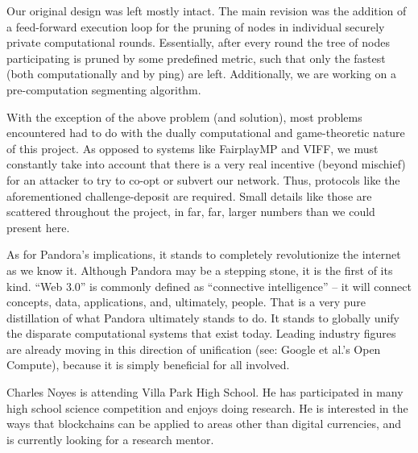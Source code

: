 \documentclass[journal,11pt]{IEEEtran}
\begin{document}
\par Our original design was left mostly intact. The main revision was the addition of a feed-forward execution loop for the pruning of nodes in individual securely private computational rounds. Essentially, after every round the tree of nodes participating is pruned by some predefined metric, such that only the fastest (both computationally and by ping) are left. Additionally, we are working on a pre-computation segmenting algorithm.

\par With the exception of the above problem (and solution), most problems encountered had to do with the dually computational and game-theoretic nature of this project. As opposed to systems like FairplayMP and VIFF, we must constantly take into account that there is a very real incentive (beyond mischief) for an attacker to try to co-opt or subvert our network. Thus, protocols like the aforementioned challenge-deposit are required. Small details like those are scattered throughout the project, in far, far, larger numbers than we could present here.

\par As for Pandora’s implications, it stands to completely revolutionize the internet as we know it. Although Pandora may be a stepping stone, it is the first of its kind. “Web 3.0” is commonly defined as “connective intelligence” – it will connect concepts, data, applications, and, ultimately, people. That is a very pure distillation of what Pandora ultimately stands to do. It stands to globally unify the disparate computational systems that exist today. Leading industry figures are already moving in this direction of unification (see: Google et al.’s Open Compute), because it is simply beneficial for all involved.


\begin{IEEEbiographynophoto}{Charles Noyes}
is  attending Villa Park High School. He has participated in many high school science competition and enjoys doing research. He is interested in the ways that blockchains can be applied to areas other than digital currencies, and is currently looking for a research mentor.
\end{IEEEbiographynophoto}



\end{document}
